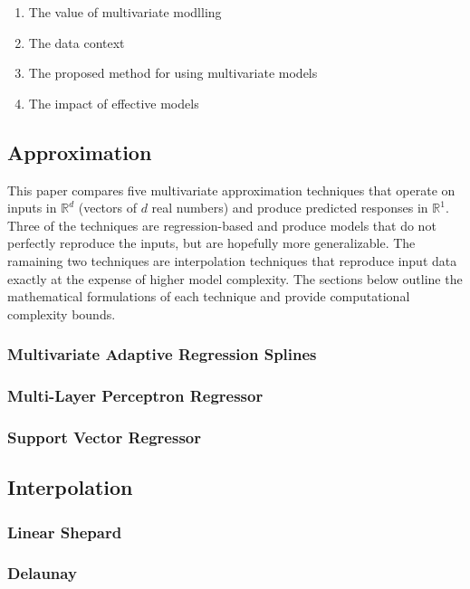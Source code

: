 \documentclass{scspaperproc}
\theoremstyle{scsthe}
\begin{document}
\begin{enumerate}
\item The value of multivariate modlling
\item The data context
\item The proposed method for using multivariate models
\item The impact of effective models
\end{enumerate}

\subsection{Approximation}

This paper compares five multivariate approximation techniques that
operate on inputs in $\mathbb{R}^d$ (vectors of $d$ real numbers) and
produce predicted responses in $\mathbb{R}^1$. Three of the techniques
are regression-based and produce models that do not perfectly
reproduce the inputs, but are hopefully more generalizable. The
ramaining two techniques are interpolation techniques that reproduce
input data exactly at the expense of higher model complexity. The
sections below outline the mathematical formulations of each technique
and provide computational complexity bounds.

\subsubsection{Multivariate Adaptive Regression Splines}
\subsubsection{Multi-Layer Perceptron Regressor}
\subsubsection{Support Vector Regressor}

\subsection{Interpolation}
\subsubsection{Linear Shepard}
\subsubsection{Delaunay}
\end{document}

